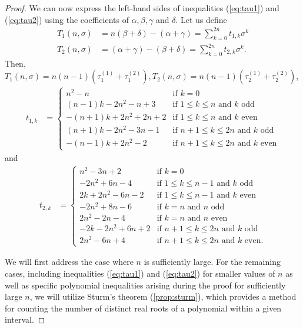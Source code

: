\documentclass{article}
\theoremstyle{plain}
\theoremstyle{definition}
\theoremstyle{remark}
\begin{document}
\begin{proof}
We can now express the left-hand sides of inequalities (\ref{eq:tau1}) and (\ref{eq:tau2}) using the coefficients of $\alpha, \beta, \gamma$ and $\delta$. Let us define 
\begin{align*}
    T_1(n, \sigma) &= n(\beta+\delta)-(\alpha+\gamma)=\sum_{k=0}^{2n} t_{1,k}\sigma^k \\
    T_2(n, \sigma) &= (\alpha+\gamma)-(\beta+\delta)=\sum_{k=0}^{2n} t_{2,k}\sigma^k.
\end{align*}
Then, $T_1(n, \sigma) = n(n-1)(\tau_{1}^{(1)} + \tau_{1}^{(2)}), T_2(n, \sigma) = n(n-1)(\tau_{2}^{(1)} + \tau_{2}^{(2)})$,
\begin{align*}
    t_{1,k} &= 
    \begin{cases}
        n^2 - n & \text{if } k=0 \\ 
        (n - 1)k - 2n^2 - n + 3 & \text{if } 1 \le k \le n \text{ and } k \text{ odd} \\ 
        -(n + 1)k + 2n^2 + 2n + 2 & \text{if } 1 \le k \le n \text{ and } k \text{ even} \\ 
        (n + 1)k - 2n^2 - 3n - 1 & \text{if } n+1 \le k \le 2n \text{ and } k \text{ odd} \\ 
        -(n - 1)k + 2n^2 - 2 & \text{if } n+1 \le k \le 2n \text{ and } k \text{ even} 
    \end{cases}
\end{align*}
and 
\begin{align*}
    t_{2,k} &= 
    \begin{cases}
        n^2 - 3n + 2 & \text{if } k=0 \\
        -2n^2 + 6n - 4 & \text{if } 1 \le k \le n-1 \text{ and } k \text{ odd} \\
        2k + 2n^2 - 6n - 2 & \text{if } 1 \le k \le n-1 \text{ and } k \text{ even} \\
        -2n^2 + 8n - 6 & \text{if } k=n \text{ and } n \text{ odd} \\
        2n^2 - 2n - 4 & \text{if } k=n \text{ and } n \text{ even} \\
        -2k - 2n^2 + 6n + 2 & \text{if } n+1 \le k \le 2n \text{ and } k \text{ odd} \\
        2n^2 - 6n + 4 & \text{if } n+1 \le k \le 2n \text{ and } k \text{ even.} 
    \end{cases}
\end{align*}

We will first address the case where $n$ is sufficiently large. For the remaining cases, including inequalities (\ref{eq:tau1}) and (\ref{eq:tau2}) for smaller values of $n$ as well as specific polynomial inequalities arising during the proof for sufficiently large $n$, we will utilize Sturm's theorem (\cref{prop:sturm}), which provides a method for counting the number of distinct real roots of a polynomial within a given interval.


\end{proof}
\end{document}
